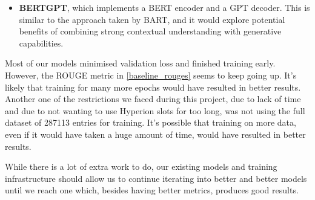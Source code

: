 \begin{description}[style=nextline,itemsep=10pt]
\begin{itemize}
			\item \textbf{BERTGPT}, which implements a BERT encoder and a GPT decoder.
				This is similar to the approach taken by BART\cite{bart_model}, and it would explore potential benefits of combining strong contextual understanding with generative capabilities.
		\end{itemize}
	\item[Just training more data and for more time]
		Most of our models minimised validation loss and finished training early.
		However, the ROUGE metric in \cref{baseline_rouges} seems to keep going up.
		It's likely that training for many more epochs would have resulted in better results. \\
		Another one of the restrictions we faced during this project, due to lack of time and due to not wanting to use Hyperion slots for too long, was not using the full dataset of \num{287113} entries for training.
		It's possible that training on more data, even if it would have taken a huge amount of time, would have resulted in better results.
\end{description}

While there is a lot of extra work to do, our existing models and training infrastructure should allow us to continue iterating into better and better models until we reach one which, besides having better metrics, produces good results.
